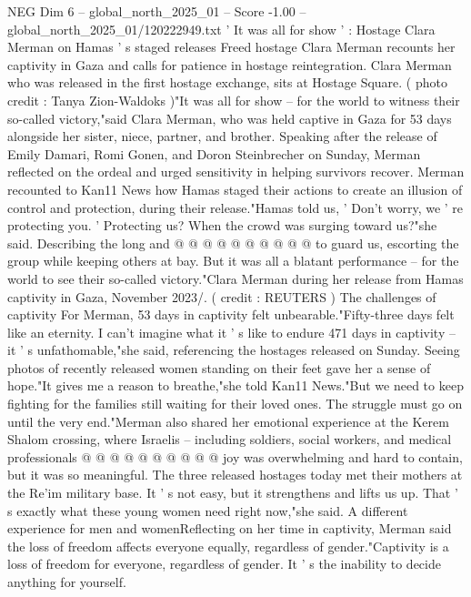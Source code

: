 \begin{textsample}{NEG Dim 6 – global\_north\_2025\_01 – Score -1.00 – global\_north\_2025\_01/120222949.txt}  \label{ex:f6_neg_100}
' It was all for show ' : Hostage Clara Merman on Hamas ' s staged releases Freed hostage Clara Merman recounts her captivity in Gaza and calls for patience in hostage reintegration.
Clara Merman who was released in the first hostage exchange, sits at Hostage Square. ( photo credit : Tanya Zion-Waldoks )"It was all for show -- for the world to witness their so-called victory,"said Clara Merman, who was held captive in Gaza for 53 days alongside her sister, niece, partner, and brother.
Speaking after the release of Emily Damari, Romi Gonen, and Doron Steinbrecher on Sunday, Merman reflected on the ordeal and urged sensitivity in helping survivors recover.
Merman recounted to Kan11 News how Hamas staged their actions to create an illusion of control and protection, during their release."Hamas told us, ' Don't worry, we ' re protecting you. ' Protecting us?
When the crowd was surging toward us?"she said.
Describing the long and @ @ @ @ @ @ @ @ @ @ to guard us, escorting the group while keeping others at bay.
But it was all a blatant performance -- for the world to see their so-called victory."Clara Merman during her release from Hamas captivity in Gaza, November 2023/. ( credit : REUTERS ) The challenges of captivity For Merman, 53 days in captivity felt unbearable."Fifty-three days felt like an eternity.
I can't imagine what it ' s like to endure 471 days in captivity -- it ' s unfathomable,"she said, referencing the hostages released on Sunday.
Seeing photos of recently released women standing on their feet gave her a sense of hope."It gives me a reason to breathe,"she told Kan11 News."But we need to keep fighting for the families still waiting for their loved ones.
The struggle must go on until the very end."Merman also shared her emotional experience at the Kerem Shalom crossing, where Israelis -- including soldiers, social workers, and medical professionals @ @ @ @ @ @ @ @ @ @ joy was overwhelming and hard to contain, but it was so meaningful.
The three released hostages today met their mothers at the Re'im military base.
It ' s not easy, but it strengthens and lifts us up.
That ' s exactly what these young women need right now,"she said.
A different experience for men and womenReflecting on her time in captivity, Merman said the loss of freedom affects everyone equally, regardless of gender."Captivity is a loss of freedom for everyone, regardless of gender.
It ' s the inability to decide anything for yourself.

\end{textsample}

